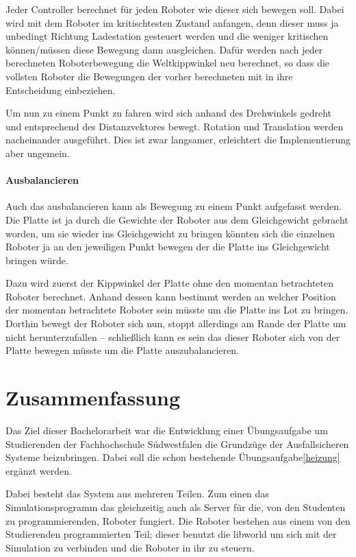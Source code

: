 {Jeder Controller berechnet f{\"{u}}r jeden Roboter wie dieser sich bewegen soll. Dabei wird mit dem Roboter
im kritischtesten Zustand anfangen, denn dieser muss ja unbedingt Richtung Ladestation gesteuert werden 
und die weniger kritischen k{\"{o}}nnen/m{\"{u}}ssen diese Bewegung dann ausgleichen. Daf{\"{u}}r werden nach
jeder berechneten Roboterbewegung die Weltkippwinkel neu berechnet, so dass die vollsten Roboter die Bewegungen
der vorher berechneten mit in ihre Entscheidung einbeziehen.


Um nun zu einem Punkt zu fahren wird sich anhand des Drehwinkels gedreht und entsprechend des Distanzvektores 
bewegt. Rotation und Translation werden nacheinander ausgef{\"{u}}hrt. Dies ist zwar langsamer, erleichtert die
Implementierung aber ungemein.

\paragraph{Ausbalancieren} Auch das ausbalancieren kann als Bewegung zu einem Punkt aufgefasst werden.
Die Platte ist ja durch die Gewichte der Roboter aus dem Gleichgewicht gebracht worden, um sie wieder ins
Gleichgewicht zu bringen k{\"{o}}nnten sich die einzelnen Roboter ja an den jeweiligen Punkt bewegen der
die Platte ins Gleichgewicht bringen w{\"{u}}rde.

Dazu wird zuerst der Kippwinkel der Platte ohne den momentan betrachteten Roboter berechnet. Anhand dessen
kann bestimmt werden an welcher Position der momentan betrachtete Roboter sein m{\"{u}}sste um die Platte
ins Lot zu bringen. Dorthin bewegt der Roboter sich nun, stoppt allerdings am Rande der Platte um nicht
herunterzufallen -- schlie{\ss}lich kann es sein das dieser Roboter sich von der Platte bewegen m{\"{u}}sste
um die Platte auszubalancieren.

\clearpage
\section{Zusammenfassung}
Das Ziel dieser Bachelorarbeit war die Entwicklung einer {\"{U}}bungsaufgabe um Studierenden der Fachhochschule
S{\"{u}}dwestfalen die Grundz{\"{u}}ge der Ausfallsicheren Systeme beizubringen. Dabei soll die schon bestehende
{\"{U}}bungsaufgabe\ref{heizung} erg{\"{a}}nzt werden.

Dabei besteht das System aus mehreren Teilen. Zum einen das Simulationsprogramm das gleichzeitig auch als
Server f{\"{u}}r die, von den Studenten zu programmierenden, Roboter fungiert. Die Roboter bestehen aus
einem von den Studierenden programmierten Teil; dieser benutzt die libworld um sich mit der Simulation zu
verbinden und die Roboter in ihr zu steuern.

}
